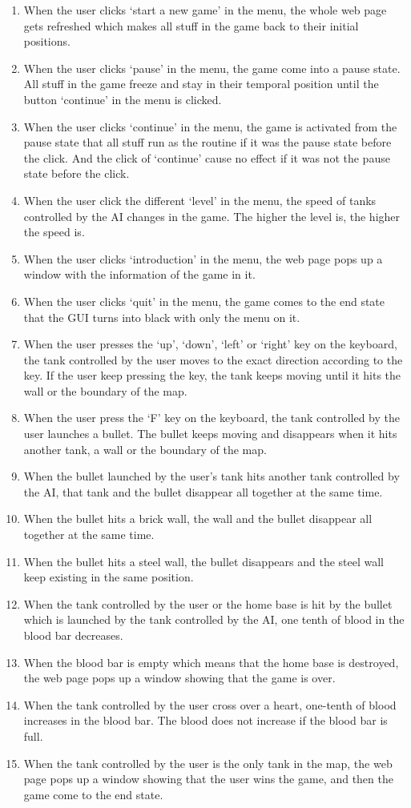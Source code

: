\documentclass[12pt, titlepage]{article}
\begin{document}
\begin{enumerate}
\item When the user clicks `start a new game' in the menu, the whole web page gets
 refreshed which makes all stuff in the game back to their initial positions.
\item When the user clicks `pause' in the menu, the game come into a pause state.
 All stuff in the game freeze and stay in their temporal position until the 
 button `continue' in the menu is clicked.
\item When the user clicks `continue' in the menu, the game is activated from 
the pause state that all stuff run as the routine if it was the pause state 
before the click. And the click of  `continue' cause no effect if it was not the 
pause state before the click.
\item When the user click the different `level' in the menu, the speed of tanks 
controlled by the AI changes in the game. The higher the level is, the higher 
the speed is.
\item When the user clicks `introduction' in the menu, the web page pops up a 
window with the information of the game in it.
\item When the user clicks `quit' in the menu, the game comes to the end state 
that the GUI turns into black with only the menu on it.
\item When the user presses the `up', `down', `left' or `right' key on the 
keyboard, the tank controlled by the user moves to the exact direction according 
to the key. If the user keep pressing the key, the tank keeps moving until it 
hits the wall or the boundary of the map.
\item When the user press the `F' key on the keyboard, the tank controlled by the
 user launches a bullet. The bullet keeps moving and disappears when it hits 
 another tank, a wall or the boundary of the map.
\item When the bullet launched by the user's tank hits another tank controlled 
by the AI, that tank and the bullet disappear all together at the same time.
\item When the bullet hits a brick wall, the wall and the bullet disappear all 
together at the same time.
\item When the bullet hits a steel wall, the bullet disappears and the steel 
wall keep existing in the same position.
\item When the tank controlled by the user or the home base is hit by the 
bullet which is launched by the tank controlled by the AI, one tenth of blood 
in the blood bar decreases.
\item When the blood bar is empty which means that the home base is destroyed, 
the web page pops up a window showing that the game is over.
\item When the tank controlled by the user cross over a heart, one-tenth of 
blood increases in the blood bar. The blood does not increase if the blood bar 
is full.
\item When the tank controlled by the user is the only tank in the map, the web 
page pops up a window showing that the user wins the game, and then the game 
come to the end state.
\end{enumerate}
\end{document}
